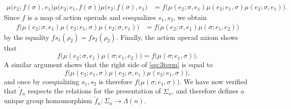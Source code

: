 \begin{example}
\begin{align*}
\mu\big( e_2; f(\sigma), e_1 \big) \mu\big( e_2; e_1, f(\sigma) \big) \mu\big( e_2; f(\sigma), e_1 \big) & = f \big( \mu(e_2; \sigma, e_1)\mu(e_2;e_1,  \sigma)\mu(e_2; \sigma, e_1) \big).
\end{align*}
Since $f$ is a map of action operads and coequalizes $s_1, s_2$, we obtain
\begin{align*}
f \big( \mu(e_2; \sigma, e_1)\mu(e_2;e_1,  \sigma)\mu(e_2; \sigma, e_1) \big) & = f\big( \mu(e_2; \sigma, e_1) \mu(\sigma; e_1, e_2) \big)
\end{align*}
by the equality $fs_1(\rho_2) = fs_2(\rho_2)$.
Finally, the action operad axiom shows that
\[
f\big( \mu(e_2; \sigma, e_1) \mu(\sigma; e_1, e_2) \big) = f\big( \mu(\sigma; e_1, \sigma) \big).
\]
A similar argument shows that the right side of \cref{eq:3term} is equal to 
\[
f \big(\mu(e_2;e_1, \sigma) \mu(e_2; \sigma, e_1)\mu(e_2;e_1,  \sigma) \big),
\]
and once by coequalizing $s_1, s_2$ is therefore $f\big( \mu(\sigma; e_1, \sigma) \big)$.
We have now verified that $\tilde{f}_n$ respects the relations for the presentation of $\Sigma_n$, and therefore defines a unique group homomorphism $\tilde{f}_n \colon \Sigma_n \to \Lambda(n)$.


\end{example}
